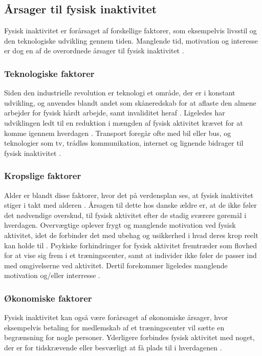 \subsection{Årsager til fysisk inaktivitet}
Fysisk inaktivitet er forårsaget af forskellige faktorer, som eksempelvis livsstil og den teknologiske udvikling gennem tiden. Manglende tid, motivation og interesse er dog en af de overordnede årsager til fysisk inaktivitet \citep{ottesen2005}.  

\subsubsection{Teknologiske faktorer}  
Siden den industrielle revolution er teknologi et område, der er i konstant udvikling, og anvendes blandt andet som skåneredskab for at aflaste den almene arbejder for fysisk hårdt arbejde, samt invaliditet heraf \citep{hallal2012}. 
Ligeledes har udviklingen ledt til en reduktion i mængden af fysisk aktivitet krævet for at komme igennem hverdagen \citep{hallal2012, motionsraad2007}. Transport foregår ofte med bil eller bus, og teknologier som tv, trådløs kommunikation, internet og lignende bidrager til fysisk inaktivitet \citep{hallal2012}.  

\subsubsection{Kropslige faktorer}
Alder er blandt disse faktorer, hvor det på verdensplan ses, at fysisk inaktivitet stiger i takt med alderen \citep{guthold2008}. 
Årsagen til dette hos danske ældre er, at de ikke føler det nødvendige overskud, til fysisk aktivitet efter de stadig sværere gøremål i hverdagen. 
Overvægtige oplever frygt og manglende motivation ved fysisk aktivitet, idet de forbinder det med ubehag og usikkerhed i hvad deres krop reelt kan holde til \citep{ottesen2005}. 
Psykiske forhindringer for fysisk aktivitet fremtræder som flovhed for at vise sig frem i et træningscenter, samt at individer ikke føler de passer ind med omgivelserne ved aktivitet. 
Dertil forekommer ligeledes manglende motivation og/eller interresse \citep{ottesen2005}.

\subsubsection{Økonomiske faktorer}
Fysisk inaktivitet kan også være forårsaget af økonomiske årsager, hvor eksempelvis betaling for medlemskab af et træningscenter vil sætte en begrænsning for nogle personer. Yderligere forbindes fysisk aktivitet med noget, der er for tidskrævende eller besværligt at få plads til i hverdagenen \citep{ottesen2005}.